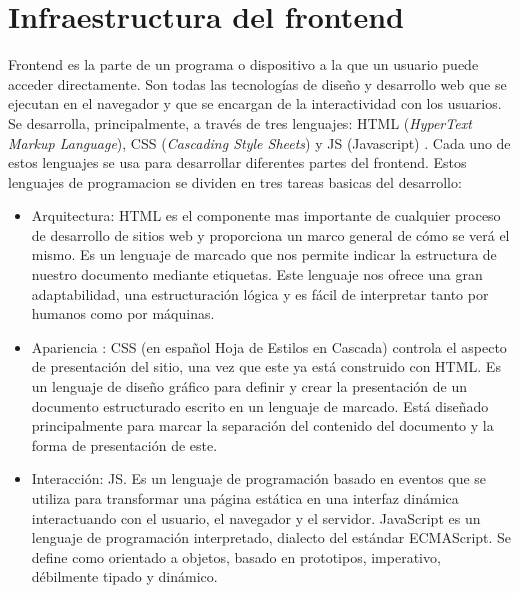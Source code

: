 \section{Infraestructura del frontend}

Frontend es la parte de un programa o dispositivo a la que un usuario puede acceder directamente. Son todas las tecnologías de diseño y desarrollo web que se ejecutan en el navegador y que se encargan de la interactividad con los usuarios.  Se desarrolla, principalmente, a través de tres lenguajes: HTML (\textit{HyperText Markup Language}), CSS (\textit{Cascading Style Sheets})\citep{WEBSITE:26} y JS (Javascript)\citep{WEBSITE:27} . Cada uno de estos lenguajes se usa para desarrollar diferentes partes del frontend.  Estos lenguajes de programacion se dividen en tres tareas basicas del desarrollo:

\begin{itemize}
	\item Arquitectura: HTML es el componente mas importante de cualquier proceso de desarrollo de sitios web y proporciona un marco general de cómo se verá el mismo. Es un lenguaje de marcado que nos permite indicar la estructura de nuestro documento mediante etiquetas. Este lenguaje nos ofrece una gran adaptabilidad, una estructuración lógica y es fácil de interpre­tar tanto por humanos como por máquinas.
	
	\item Apariencia : CSS (en español Hoja de Estilos en Cascada) controla el aspecto de presentación del sitio, una vez que este ya está construido con HTML.  Es un lenguaje de diseño gráfico para definir y crear la presentación de un documento estructurado escrito en un lenguaje de marcado. Está diseñado principalmente para marcar la separación del contenido del documento y la forma de presentación de este.
	
	\item Interacción: JS.  Es un lenguaje de programación basado en eventos que se utiliza para transformar una página estática en una interfaz dinámica interactuando con el usuario, el navegador y el servidor.  JavaScript es un lenguaje de programación interpretado, dialecto del estándar ECMAScript\citep{WEBSITE:28}.  Se define como orientado a objetos, basado en prototipos, imperativo, débilmente tipado y dinámico.
	
\end{itemize}

